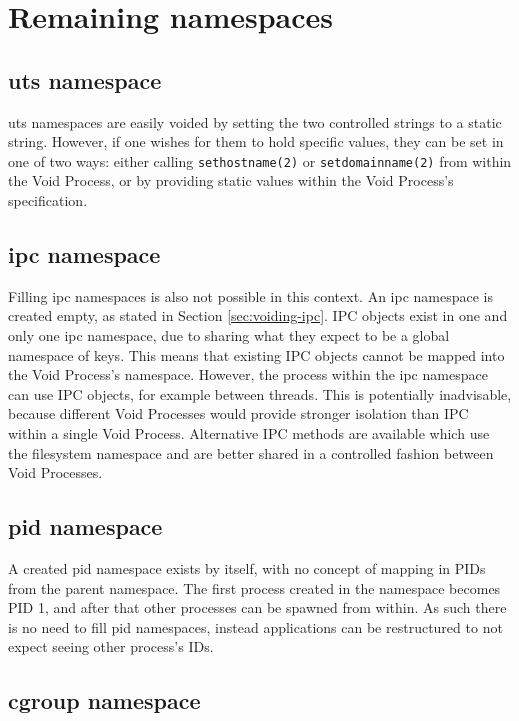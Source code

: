 \documentclass[a4paper,12pt,twoside,openright]{report}
\begin{document}
\section{Remaining namespaces}

\subsection{uts namespace}
\label{sec:filling-uts}

uts namespaces are easily voided by setting the two controlled strings to a static string. However, if one wishes for them to hold specific values, they can be set in one of two ways: either calling \texttt{sethostname(2)} or \texttt{setdomainname(2)} from within the Void Process, or by providing static values within the Void Process's specification.

\subsection{ipc namespace}
\label{sec:filling-ipc}

Filling ipc namespaces is also not possible in this context. An ipc namespace is created empty, as stated in Section \ref{sec:voiding-ipc}. IPC objects exist in one and only one ipc namespace, due to sharing what they expect to be a global namespace of keys. This means that existing IPC objects cannot be mapped into the Void Process's namespace. However, the process within the ipc namespace can use IPC objects, for example between threads. This is potentially inadvisable, because different Void Processes would provide stronger isolation than IPC within a single Void Process. Alternative IPC methods are available which use the filesystem namespace and are better shared in a controlled fashion between Void Processes.

\subsection{pid namespace}
\label{sec:filling-pid}

A created pid namespace exists by itself, with no concept of mapping in PIDs from the parent namespace. The first process created in the namespace becomes PID 1, and after that other processes can be spawned from within. As such there is no need to fill pid namespaces, instead applications can be restructured to not expect seeing other process's IDs.

\subsection{cgroup namespace}
\label{sec:filling-cgroup}
\end{document}
